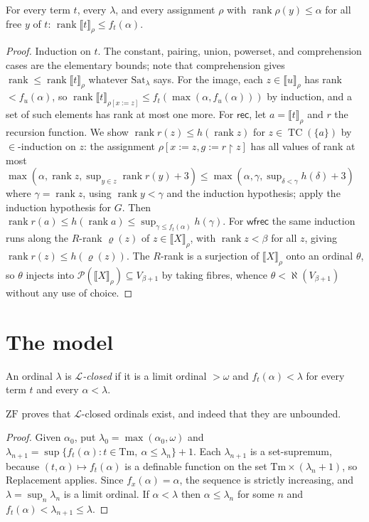 \documentclass[10pt]{article}
\newcommand{\ZF}{\mathrm{ZF}}
\newcommand{\rk}{\operatorname{rank}}
\newcommand{\TC}{\operatorname{TC}}
\newcommand{\PP}{\mathcal{P}}
\newcommand{\Sat}{\mathrm{Sat}}
\newcommand{\rec}{\mathsf{rec}}
\newcommand{\wfrec}{\mathsf{wfrec}}
\newcommand{\sem}[1]{\llbracket #1\rrbracket}
\newcommand{\Lang}{\mathcal L}
\newcommand{\Terms}{\mathrm{Tm}}
\newcommand{\hartogs}{\aleph}
\begin{document}
\begin{lemma}\label{lem:rank}
For every term $t$, every $\lambda$, and every assignment $\rho$ with
$\rk\rho(y)\le\alpha$ for all free $y$ of $t$:
$\rk\sem t_\rho\le f_t(\alpha)$.
\end{lemma}
\begin{proof}
Induction on $t$. The constant, pairing, union, powerset, and
comprehension cases are the elementary bounds; note that comprehension
gives $\rk\le\rk\sem t_\rho$ whatever $\Sat_\lambda$ says. For the image,
each $z\in\sem u_\rho$ has rank $<f_u(\alpha)$, so
$\rk\sem t_{\rho[x:=z]}\le f_t(\max(\alpha,f_u(\alpha)))$ by induction,
and a set of such elements has rank at most one more. For $\rec$, let
$a=\sem t_\rho$ and $r$ the recursion function. We show
$\rk r(z)\le h(\rk z)$ for $z\in\TC(\{a\})$ by $\in$-induction on $z$: the
assignment $\rho[x:=z,g:=r{\restriction}z]$ has all values of rank at most
$\max(\alpha,\rk z,\sup_{y\in z}\rk r(y)+3)\le\max(\alpha,\gamma,\sup_{\delta<\gamma}h(\delta)+3)$
where $\gamma=\rk z$, using $\rk y<\gamma$ and the induction hypothesis;
apply the induction hypothesis for $G$. Then
$\rk r(a)\le h(\rk a)\le\sup_{\gamma\le f_t(\alpha)}h(\gamma)$. For
$\wfrec$ the same induction runs along the $R$-rank $\varrho(z)$ of
$z\in\sem X_\rho$, with $\rk z<\beta$ for all $z$, giving
$\rk r(z)\le h(\varrho(z))$. The $R$-rank is a surjection of
$\sem X_\rho$ onto an ordinal $\theta$, so $\theta$ injects into
$\PP(\sem X_\rho)\subseteq V_{\beta+1}$ by taking fibres, whence
$\theta<\hartogs(V_{\beta+1})$ without any use of choice.
\end{proof}

\section{The model}\label{sec:model}

\begin{definition}
An ordinal $\lambda$ is \emph{$\Lang$-closed} if it is a limit ordinal
$>\omega$ and $f_t(\alpha)<\lambda$ for every term $t$ and every $\alpha<\lambda$.
\end{definition}

\begin{lemma}\label{lem:closed}
$\ZF$ proves that $\Lang$-closed ordinals exist, and indeed that they are
unbounded.
\end{lemma}
\begin{proof}
Given $\alpha_0$, put $\lambda_0=\max(\alpha_0,\omega)$ and
$\lambda_{n+1}=\sup\{f_t(\alpha):t\in\Terms,\ \alpha\le\lambda_n\}+1$.
Each $\lambda_{n+1}$ is a set-supremum, because $(t,\alpha)\mapsto f_t(\alpha)$
is a definable function on the set $\Terms\times(\lambda_n+1)$, so
Replacement applies. Since $f_x(\alpha)=\alpha$, the sequence is strictly
increasing, and $\lambda=\sup_n\lambda_n$ is a limit ordinal. If
$\alpha<\lambda$ then $\alpha\le\lambda_n$ for some $n$ and
$f_t(\alpha)<\lambda_{n+1}\le\lambda$.
\end{proof}
\end{document}
